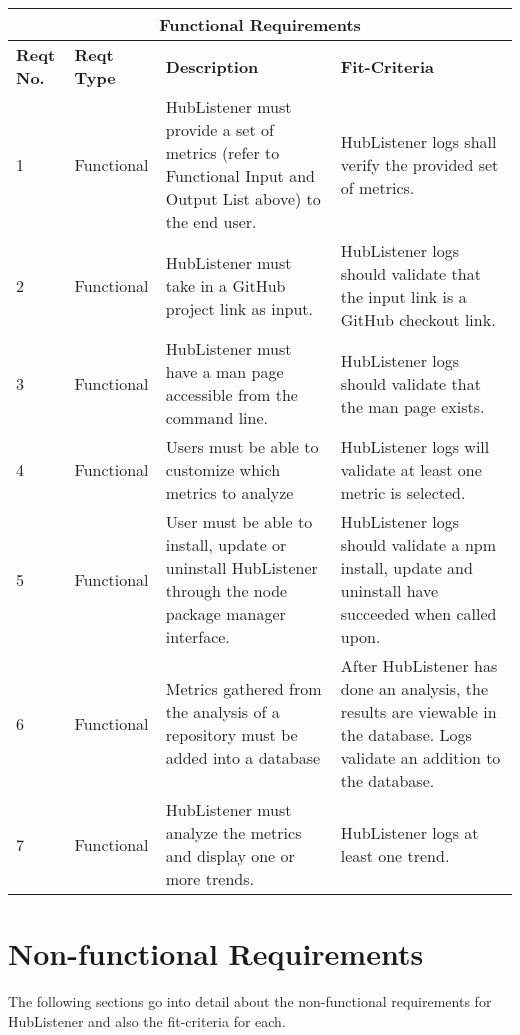 \documentclass{article}
\begin{document}
\begin{tabular}{ |p{1cm}|p{2cm}|p{5cm}|p{3cm}|  }
\hline
\multicolumn{4}{|c|}{\textbf{Functional Requirements}} \\
\hline
\textbf{Reqt No.} & \textbf{Reqt Type} & \textbf{Description} & \textbf{Fit-Criteria}\\
\hline 
1 & Functional & HubListener must provide a set of metrics (refer to Functional Input and Output List above) to the end user. & HubListener logs shall verify the provided set of metrics.\\
\hline 
2 & Functional & HubListener must take in a GitHub project link as input. & HubListener logs should validate that the input link is a GitHub checkout link.\\
\hline 
3 & Functional & HubListener must have a man page accessible from the command line. & HubListener logs should validate that the man page exists.\\ 
\hline 
4 & Functional & Users must be able to customize which metrics to analyze & HubListener logs will validate at least one metric is selected.\\
\hline 
5 & Functional & User must be able to install, update or uninstall HubListener through the node package manager interface. & HubListener logs should validate a npm install, update and uninstall have succeeded when called upon. \\
\hline 
6 & Functional & Metrics gathered from the analysis of a repository must be added into a database & After HubListener has done an analysis, the results are viewable in the database. Logs validate an addition to the database.  \\
\hline 
7 & Functional & HubListener must analyze the metrics and display one or more trends. & HubListener logs at least one trend. \\
\hline
\end{tabular}

\iffalse
\fi 
\newpage
\section{Non-functional Requirements}

The following sections go into detail about the non-functional requirements for HubListener and also the fit-criteria for each. \newline
\end{document}
